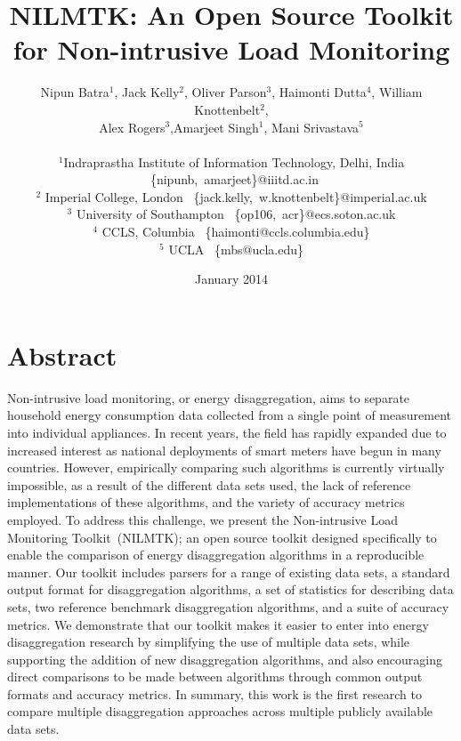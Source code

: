 \documentclass{sig-alternate}
\title{NILMTK: An Open Source Toolkit for Non-intrusive Load Monitoring}
\author{Nipun Batra$^1$, Jack Kelly$^2$, Oliver Parson$^3$, Haimonti Dutta$^4$, William Knottenbelt$^2$,\\ Alex Rogers$^3$,Amarjeet Singh$^1$, Mani Srivastava$^5$\\ \\
\small$^1$Indraprastha Institute of Information Technology, Delhi, India ~\{nipunb,~amarjeet\}@iiitd.ac.in\\
\small$^2$ Imperial College, London ~\{jack.kelly,~w.knottenbelt\}@imperial.ac.uk\\
\small$^3$ University of Southampton ~\{op106,~acr\}@ecs.soton.ac.uk\\
\small$^4$ CCLS, Columbia ~\{haimonti@ccls.columbia.edu\}\\
\small$^5$ UCLA ~\{mbs@ucla.edu\}\\
}
\date{January 2014}
\newcommand\Mark[1]{\textsuperscript#1}
\begin{document}
\maketitle


\section{Abstract}

\noindent
Non-intrusive load monitoring, or energy disaggregation, aims to separate household energy consumption data collected from a single point of measurement into individual appliances. In recent years, the field has rapidly expanded due to increased interest as national deployments of smart meters have begun in many countries. However, empirically comparing such algorithms is currently virtually impossible, as a result of the different data sets used, the lack of reference implementations of these algorithms, and the variety of accuracy metrics employed. To address this challenge, we present the Non-intrusive Load Monitoring Toolkit~(NILMTK); an open source toolkit designed specifically to enable the comparison of energy disaggregation algorithms in a reproducible manner. Our toolkit includes parsers for a range of existing data sets, a standard output format for disaggregation algorithms, a set of statistics for describing data sets, two reference benchmark disaggregation algorithms, and a suite of accuracy metrics. We demonstrate that our toolkit makes it easier to enter into energy disaggregation research by simplifying the use of multiple data sets, while supporting the addition of new disaggregation algorithms, and also encouraging direct comparisons to be made between algorithms through common output formats and accuracy metrics. In summary, this work is the first research to compare multiple disaggregation approaches across multiple publicly available data sets.
\end{document}
